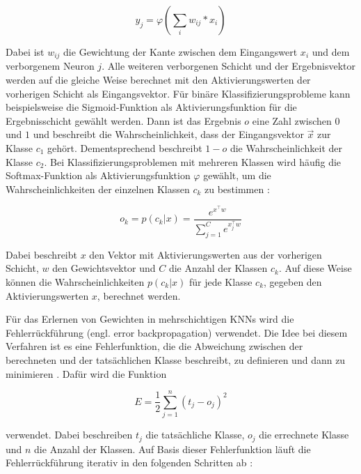\begin{equation}
y_j = \varphi(\sum_i{w_{ij}*x_i})
\end{equation}

Dabei ist $w_{ij}$ die Gewichtung der Kante zwischen dem Eingangswert $x_i$ und dem verborgenem Neuron $j$. Alle weiteren verborgenen Schicht und der Ergebnisvektor werden auf die gleiche Weise berechnet mit den Aktivierungswerten der vorherigen Schicht als Eingangsvektor. Für binäre Klassifizierungsprobleme kann beispielsweise die Sigmoid-Funktion als Aktivierungsfunktion für die Ergebnisschicht gewählt werden. Dann ist das Ergebnis $o$ eine Zahl zwischen $0$ und $1$ und beschreibt die Wahrscheinlichkeit, dass der Eingangsvektor $\vec{x}$ zur Klasse $c_1$ gehört. Dementsprechend beschreibt $1-o$ die Wahrscheinlichkeit der Klasse $c_2$. Bei Klassifizierungsproblemen mit mehreren Klassen wird häufig die Softmax-Funktion als Aktivierungsfunktion $\varphi$ gewählt, um die Wahrscheinlichkeiten der einzelnen Klassen $c_k$ zu bestimmen \cite{bridle1990probabilistic}:

\begin{equation}
o_k = p(c_k|x) = \frac{e^{x^\top w}}{\sum_{j=1}^Ce^{x_j^\top w}}
\end{equation}

Dabei beschreibt $x$ den Vektor mit Aktivierungswerten aus der vorherigen Schicht, $w$ den Gewichtsvektor und $C$ die Anzahl der Klassen $c_k$. Auf diese Weise können die Wahrscheinlichkeiten $p(c_k|x)$ für jede Klasse $c_k$, gegeben den Aktivierungswerten $x$, berechnet werden.

Für das Erlernen von Gewichten in mehrschichtigen \acp{KNN} wird die Fehlerrückführung (engl. error backpropagation) verwendet. Die Idee bei diesem Verfahren ist es eine Fehlerfunktion, die die Abweichung zwischen der berechneten und der tatsächlichen Klasse beschreibt, zu definieren und dann zu minimieren \cite{bishop2006pattern}. Dafür wird die Funktion

\begin{equation}
E = \frac{1}{2}\sum_{j=1}^n(t_j-o_j)^2
\end{equation}

verwendet. Dabei beschreiben $t_j$ die tatsächliche Klasse, $o_j$ die errechnete Klasse und $n$ die Anzahl der Klassen. Auf Basis dieser Fehlerfunktion läuft die Fehlerrückführung iterativ in den folgenden Schritten ab \cite{bishop2006pattern}:

